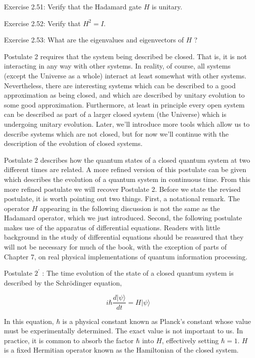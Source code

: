 \documentclass[10pt]{article}
\begin{document}
Exercise 2.51: Verify that the Hadamard gate $H$ is unitary.

Exercise 2.52: Verify that $H^{2}=I$.

Exercise 2.53: What are the eigenvalues and eigenvectors of $H$ ?

Postulate 2 requires that the system being described be closed. That is, it is not interacting in any way with other systems. In reality, of course, all systems (except the Universe as a whole) interact at least somewhat with other systems. Nevertheless, there are interesting systems which can be described to a good approximation as being closed, and which are described by unitary evolution to some good approximation. Furthermore, at least in principle every open system can be described as part of a larger closed system (the Universe) which is undergoing unitary evolution. Later, we'll introduce more tools which allow us to describe systems which are not closed, but for now we'll continue with the description of the evolution of closed systems.

Postulate 2 describes how the quantum states of a closed quantum system at two different times are related. A more refined version of this postulate can be given which describes the evolution of a quantum system in continuous time. From this more refined postulate we will recover Postulate 2. Before we state the revised postulate, it is worth pointing out two things. First, a notational remark. The operator $H$ appearing in the following discussion is not the same as the Hadamard operator, which we just introduced. Second, the following postulate makes use of the apparatus of differential equations. Readers with little background in the study of differential equations should be reassured that they will not be necessary for much of the book, with the exception of parts of Chapter 7, on real physical implementations of quantum information processing.

Postulate $2^{\prime}$ : The time evolution of the state of a closed quantum system is described by the Schrödinger equation,


\begin{equation*}
i \hbar \frac{d|\psi\rangle}{d t}=H|\psi\rangle \tag{2.86}
\end{equation*}


In this equation, $\hbar$ is a physical constant known as Planck's constant whose value must be experimentally determined. The exact value is not important to us. In practice, it is common to absorb the factor $\hbar$ into $H$, effectively setting $\hbar=1$. $H$ is a fixed Hermitian operator known as the Hamiltonian of the closed system.
\end{document}
